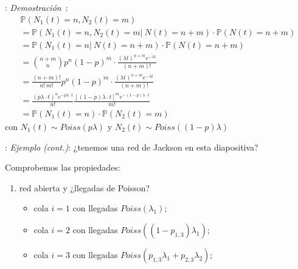 \documentclass[xcolor={x11names}]{beamer}
\newcommand{\cmark}{\ding{51}}%
\begin{document}
\begin{frame}{\secname: \subsecname}
    \textit{Demostración}~\cite{amable}:
    \begin{multline*}
        \mathbb{P}(N_1(t)=n,N_2(t)=m)\\
        =\mathbb{P}(N_1(t)=n,N_2(t)=m|\ N(t)=n+m)\cdot \mathbb{P}(N(t)=n+m)\\
        =\mathbb{P}(N_1(t)=n|\ N(t)=n+m)\cdot \mathbb{P}(N(t)=n+m)\\
        ={n+m\choose n}p^n(1-p)^m\cdot 
        \frac{(\lambda t)^{n+m}e^{-\lambda t}}{(n+m)!}\\
        =\frac{(n+m)!}{n!\ m!}p^n(1-p)^m\cdot 
        \frac{(\lambda t)^{n+m}e^{-\lambda t}}{(n+m)!}\\
        =\frac{(p\lambda\cdot t)^n e^{-p\lambda\cdot t}}{n!}
        \frac{[(1-p)\lambda\cdot t]^m e^{-(1-p)\lambda\cdot t}}{m!}\\
        = \mathbb{P}(N_1(t)=n)\cdot \mathbb{P}(N_2(t)=m)
    \end{multline*}
    con $N_1(t)\sim Poiss(p\lambda)$
    y $N_2(t)\sim Poiss((1-p)\lambda)$
\end{frame}


\begin{frame}{\secname: \subsecname}
    \textit{Ejemplo (cont.)}: ¿tenemos una red
    de Jackson en esta diapositiva?

    \begin{figure}
        \resizebox{.7\textwidth}{!}{%
            
        }
    \end{figure}

    Comprobemos las propiedades:
    \begin{enumerate}
        \item \cmark red abierta y
            ¿llegadas de Poisson?

            \begin{itemize}
                \item \cmark
                    cola $i=1$ con llegadas
                    $Poiss(\lambda_1)$;
                \item \cmark
                    cola $i=2$ con llegadas
                    $Poiss\left((1-p_{1,3})\lambda_1\right)$;
                \item \cmark
                    cola $i=3$ con llegadas
                    $Poiss\left(p_{1,3}\lambda_1+p_{2,3}\lambda_2\right)$;
            \end{itemize}
    \end{enumerate}
\end{frame}
\end{document}
